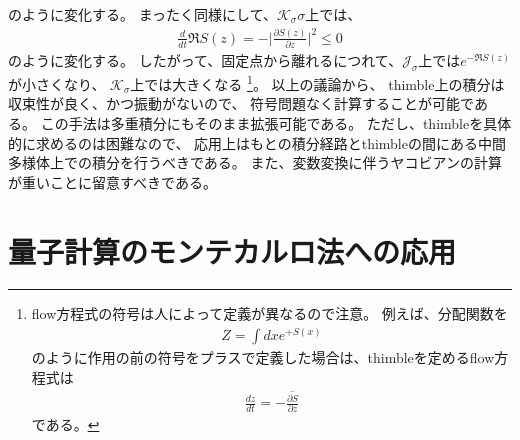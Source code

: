 \documentclass[]{ltjsarticle}
\newcommand{\del}{\partial}
\newcommand{\calJ}{\mathcal{J}}
\newcommand{\calK}{\mathcal{K}}
\begin{document}
のように変化する。
まったく同様にして、$\calK_\sigma\sigma$上では、
\begin{align}
	\frac{d}{dt} \Re S(z)
	=-\Bigg| \frac{\del S(z)}{\del z} \Bigg|^2 \leq 0
\end{align}
のように変化する。
したがって、固定点から離れるにつれて、$\calJ_\sigma$上では$e^{-\Re S(z)}$が小さくなり、
$\calK_\sigma$上では大きくなる
\footnote{
	flow方程式の符号は人によって定義が異なるので注意。
	例えば、分配関数を
	\begin{align}
		Z = \int dx e^{+S(x)}
	\end{align}
	のように作用の前の符号をプラスで定義した場合は、thimbleを定めるflow方程式は
	\begin{align}
		\frac{d z}{d t} = -\overline{\frac{\del S}{\del z}}
	\end{align}
	である。
}。
以上の議論から、
thimble上の積分は収束性が良く、かつ振動がないので、
符号問題なく計算することが可能である。
この手法は多重積分にもそのまま拡張可能である。
ただし、thimbleを具体的に求めるのは困難なので、
応用上はもとの積分経路とthimbleの間にある中間多様体上での積分を行うべきである。
また、変数変換に伴うヤコビアンの計算が重いことに留意すべきである。



\section{量子計算のモンテカルロ法への応用}






%
%
\end{document}
